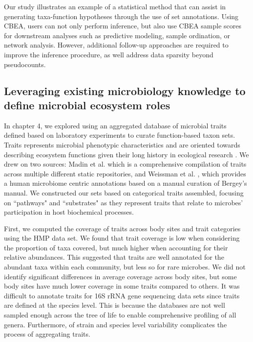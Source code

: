 Our study illustrates an example of a statistical method that can assist in generating taxa-function hypotheses through the use of set annotations. Using CBEA, users can not only perform inference, but also use CBEA sample scores for downstream analyses such as predictive modeling, sample ordination, or network analysis. However, additional follow-up approaches are required to improve the inference procedure, as well address data sparsity beyond pseudocounts. 

\subsection{Leveraging existing microbiology knowledge to define microbial ecosystem roles}

In chapter 4, we explored using an aggregated database of microbial traits defined based on laboratory experiments to curate function-based taxon sets. Traits represents microbial phenotypic characteristics and are oriented towards describing ecosystem functions given their long history in ecological research \cite{krause2014traitbased}. We drew on two sources: Madin et al. \cite{madin2020synthesis} which is a comprehensive compilation of traits across multiple different static repositories, and Weissman et al. \cite{weissman2021exploring}, which provides a human microbiome centric annotations based on a manual curation of Bergey's manual. We constructed our sets based on categorical traits assembled, focusing on ``pathways" and ``substrates" as they represent traits that relate to microbes' participation in host biochemical processes.   

First, we computed the coverage of traits across body sites and trait categories using the HMP data set. We found that trait coverage is low when considering the proportion of taxa covered, but much higher when accounting for their relative abundances. This suggested that traits are well annotated for the abundant taxa within each community, but less so for rare microbes. We did not identify significant differences in average coverage across body sites, but some body sites have much lower coverage in some traits compared to others. It was difficult to annotate traits for 16S rRNA gene sequencing data sets since traits are defined at the species level. This is because the databases are not well sampled enough across the tree of life to enable comprehensive profiling of all genera. Furthermore, of strain and species level variability \cite{lloyd-price2017strains} complicates the process of aggregating traits.   

